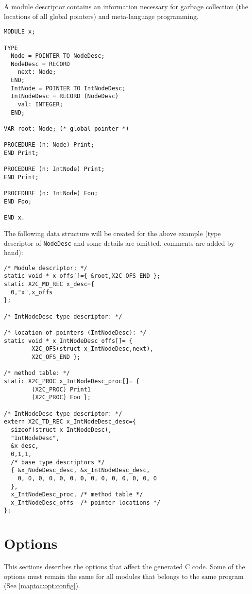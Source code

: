 A module descriptor contains an information necessary for garbage
collection (the locations of all global pointers)  and
meta-language programming.

\Example
\begin{verbatim}
MODULE x;

TYPE
  Node = POINTER TO NodeDesc;
  NodeDesc = RECORD
    next: Node;
  END;
  IntNode = POINTER TO IntNodeDesc;
  IntNodeDesc = RECORD (NodeDesc)
    val: INTEGER;
  END;

VAR root: Node; (* global pointer *)

PROCEDURE (n: Node) Print;
END Print;

PROCEDURE (n: IntNode) Print;
END Print;

PROCEDURE (n: IntNode) Foo;
END Foo;

END x.
\end{verbatim}

The following data structure will be created for the above example
(type descriptor of {\tt NodeDesc} and some details
are omitted, comments are added by hand):
\begin{verbatim}
/* Module descriptor: */
static void * x_offs[]={ &root,X2C_OFS_END };
static X2C_MD_REC x_desc={
  0,"x",x_offs
};

/* IntNodeDesc type descriptor: */

/* location of pointers (IntNodeDesc): */
static void * x_IntNodeDesc_offs[]= {
        X2C_OFS(struct x_IntNodeDesc,next),
        X2C_OFS_END };

/* method table: */
static X2C_PROC x_IntNodeDesc_proc[]= {
        (X2C_PROC) Print1
        (X2C_PROC) Foo };

/* IntNodeDesc type descriptor: */
extern X2C_TD_REC x_IntNodeDesc_desc={
  sizeof(struct x_IntNodeDesc),
  "IntNodeDesc",
  &x_desc,
  0,1,1,
  /* base type descriptors */
  { &x_NodeDesc_desc, &x_IntNodeDesc_desc,
    0, 0, 0, 0, 0, 0, 0, 0, 0, 0, 0, 0, 0, 0
  },
  x_IntNodeDesc_proc, /* method table */
  x_IntNodeDesc_offs  /* pointer locations */
};
\end{verbatim}


\section{Options}

This sections describes the options that affect the generated
C code. Some of the options must remain the same for all modules
that belongs to the same program (See \ref{maptoc:opt:config}).

